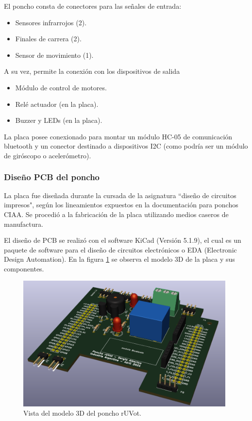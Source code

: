 El poncho consta de conectores para las señales de entrada:

\begin{itemize}
	\item Sensores infrarrojos (2).
	\item Finales de carrera (2).
	\item Sensor de movimiento (1).
\end{itemize}

A su vez, permite la conexión con los dispositivos de salida

\begin{itemize}
	\item Módulo de control de motores.
	\item Relé actuador (en la placa).
	\item Buzzer y LEDs (en la placa).
\end{itemize}

La placa posee conexionado para montar un módulo HC-05 de comunicación bluetooth y un conector destinado a dispositivos I2C (como podría ser un módulo de giróscopo o acelerómetro).

		\subsubsection{Diseño PCB del poncho}


La placa fue diseñada durante la cursada de la asignatura “diseño de circuitos impresos", según los lineamientos expuestos en la documentación para ponchos CIAA. Se procedió a la fabricación de la placa utilizando medios caseros de manufactura.

El diseño de PCB se realizó con el software KiCad \citep{KiCad} (Versión 5.1.9), el cual es un paquete de software para el diseño de circuitos electrónicos o EDA (Electronic Design
Automation). En la figura \ref{fig:poncho3d} se observa el modelo 3D de la placa y sus componentes.


\begin{figure}[h]
	\centering
	\includegraphics[width=11cm]{./Figures/ponchoiso.PNG}
	\caption{Vista del modelo 3D del poncho rUVot.}
	\label{fig:poncho3d}
\end{figure}


